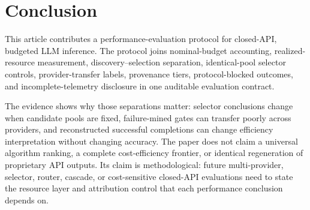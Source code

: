 \section{Conclusion}
\label{sec:conclusion}

This article contributes a performance-evaluation protocol for closed-API, budgeted LLM inference.
The protocol joins nominal-budget accounting, realized-resource measurement, discovery--selection
separation, identical-pool selector controls, provider-transfer labels, provenance tiers,
protocol-blocked outcomes, and incomplete-telemetry disclosure in one auditable evaluation contract.

The evidence shows why those separations matter: selector conclusions change when candidate pools
are fixed, failure-mined gates can transfer poorly across providers, and reconstructed successful
completions can change efficiency interpretation without changing accuracy. The paper does not
claim a universal algorithm ranking, a complete cost-efficiency frontier, or identical regeneration
of proprietary API outputs. Its claim is methodological: future multi-provider, selector, router,
cascade, or cost-sensitive closed-API evaluations need to state the resource layer and attribution
control that each performance conclusion depends on.

